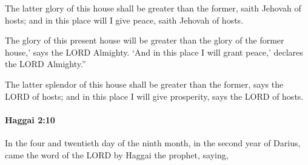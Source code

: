 			\begin{versebox}
					\item[BHS] 
					\item[LXX] 
					\item[ASV] The latter glory of this house shall be greater than the former, saith Jehovah of hosts; and in this place will I give peace, saith Jehovah of hosts.
					\item[NIV] The glory of this present house will be greater than the glory of the former house,’ says the LORD Almighty. ‘And in this place I will grant peace,’ declares the LORD Almighty.”
					\item[NRSV] The latter splendor of this house shall be greater than the former, says the LORD of hosts; and in this place I will give prosperity, says the LORD of hosts.
			\end{versebox}

		\paragraph{Haggai 2:10} %
			\label{HAGGAI-2-10}

			In the four and twentieth day of the ninth month, in the second year of Darius, came the word of the LORD by Haggai the prophet, saying,

